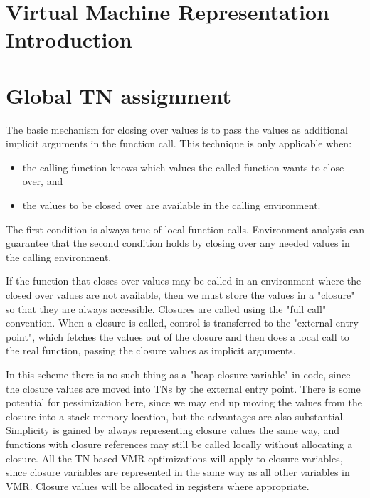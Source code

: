 

\chapter{Virtual Machine Representation Introduction}


\chapter{Global TN assignment}


The basic mechanism for closing over values is to pass the values as additional
implicit arguments in the function call.  This technique is only applicable
when:

\begin{itemize}
\item the calling function knows which values the called function wants to close
    over, and
\item the values to be closed over are available in the calling
  environment.
\end{itemize}

The first condition is always true of local function calls.  Environment
analysis can guarantee that the second condition holds by closing over any
needed values in the calling environment.

If the function that closes over values may be called in an environment where
the closed over values are not available, then we must store the values in a
"closure" so that they are always accessible.  Closures are called using the
"full call" convention.  When a closure is called, control is transferred to
the "external entry point", which fetches the values out of the closure and
then does a local call to the real function, passing the closure values as
implicit arguments.

In this scheme there is no such thing as a "heap closure variable" in code,
since the closure values are moved into TNs by the external entry point.  There
is some potential for pessimization here, since we may end up moving the values
from the closure into a stack memory location, but the advantages are also
substantial.  Simplicity is gained by always representing closure values the
same way, and functions with closure references may still be called locally
without allocating a closure.  All the TN based VMR optimizations will apply
to closure variables, since closure variables are represented in the same way
as all other variables in VMR.  Closure values will be allocated in registers
where appropriate.

